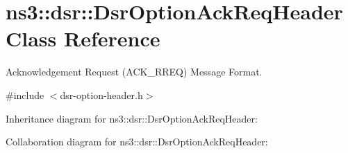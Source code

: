 \hypertarget{classns3_1_1dsr_1_1DsrOptionAckReqHeader}{}\section{ns3\+:\+:dsr\+:\+:Dsr\+Option\+Ack\+Req\+Header Class Reference}
\label{classns3_1_1dsr_1_1DsrOptionAckReqHeader}


Acknowledgement Request (A\+C\+K\+\_\+\+R\+R\+EQ) Message Format.  




{\ttfamily \#include $<$dsr-\/option-\/header.\+h$>$}



Inheritance diagram for ns3\+:\+:dsr\+:\+:Dsr\+Option\+Ack\+Req\+Header\+:


Collaboration diagram for ns3\+:\+:dsr\+:\+:Dsr\+Option\+Ack\+Req\+Header\+:
